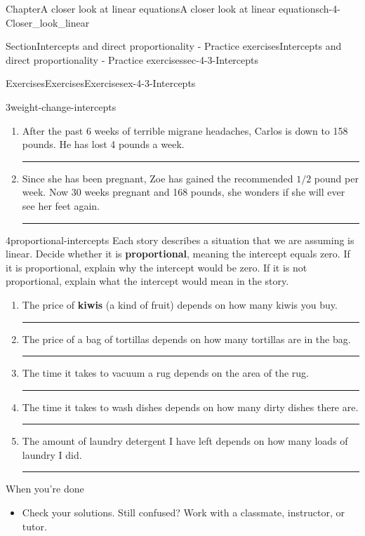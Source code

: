 \documentclass[twoside,11pt,]{book}
\newcommand{\terminology}[1]{\textbf{#1}}
\newlength{\workspacestrutwidth}
\numberwithin{equation}{section}
\newcommand{\sfrac}[2]{{#1}/{#2}}
\begin{document}
\begin{chapterptx}{Chapter}{A closer look at linear equations}{}{A closer look at linear equations}{}{}{ch-4-Closer_look_linear}
\begin{sectionptx}{Section}{Intercepts and direct proportionality - Practice exercises}{}{Intercepts and direct proportionality - Practice exercises}{}{}{sec-4-3-Intercepts}
\begin{exercises-subsection-numberless}{Exercises}{Exercises}{}{Exercises}{}{}{ex-4-3-Intercepts}
\begin{divisionexercise}{3}{}{}{weight-change-intercepts}
\begin{enumerate}[label=(\alph*),ref=\alph*]
\item{}After the past 6 weeks of terrible migrane headaches, Carlos is down to 158 pounds. He has lost 4 pounds a week.%
\par\rule{\workspacestrutwidth}{1.3in}%
\item{}Since she has been pregnant, Zoe has gained the recommended \(\sfrac{1}{2}\) pound per week. Now 30 weeks pregnant and 168 pounds, she wonders if she will ever see her feet again.%
\par\rule{\workspacestrutwidth}{1.3in}%
\end{enumerate}%
\end{divisionexercise}%
\clearpage
\begin{divisionexercise}{4}{}{}{proportional-intercepts}%
Each story describes a situation that we are assuming is linear. Decide whether it is \terminology{proportional}, meaning the intercept equals zero. If it is proportional, explain why the intercept would be zero. If it is not proportional, explain what the intercept would mean in the story.%
\begin{enumerate}[label=(\alph*),ref=\alph*]%
\item{}The price of \terminology{kiwis} (a kind of fruit) depends on how many kiwis you buy.%
\par\rule{\workspacestrutwidth}{1in}%
\item{}The price of a bag of tortillas depends on how many tortillas are in the bag.%
\par\rule{\workspacestrutwidth}{1in}%
\item{}The time it takes to vacuum a rug depends on the area of the rug.%
\par\rule{\workspacestrutwidth}{1in}%
\item{}The time it takes to wash dishes depends on how many dirty dishes there are.%
\par\rule{\workspacestrutwidth}{1in}%
\item{}The amount of laundry detergent I have left depends on how many loads of laundry I did.%
\par\rule{\workspacestrutwidth}{1.25in}%
\end{enumerate}%
\end{divisionexercise}%
\end{exercises-subsection-numberless}
\begin{conclusion}{When you're done \textellipsis{}}%
%
\begin{itemize}[label=\textbullet]
\item{}Check your solutions. Still confused? Work with a classmate, instructor, or tutor.%

\end{itemize}
\end{conclusion}
\end{sectionptx}
\end{chapterptx}
\end{document}
